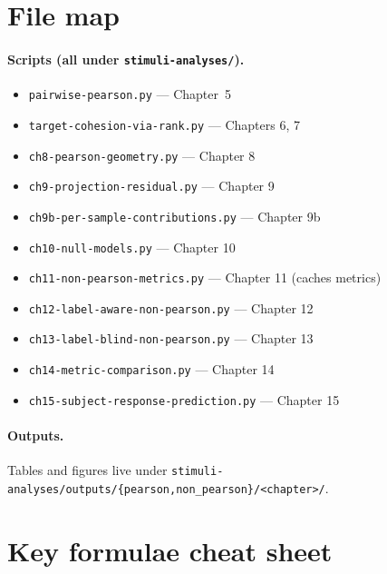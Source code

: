 \documentclass[11pt]{article}
\begin{document}
\appendix
\section{File map}

\paragraph{Scripts (all under \texttt{stimuli-analyses/}).}
\begin{itemize}[leftmargin=*]
\item \texttt{pairwise-pearson.py} --- Chapter~5
\item \texttt{target-cohesion-via-rank.py} --- Chapters 6, 7
\item \texttt{ch8-pearson-geometry.py} --- Chapter 8
\item \texttt{ch9-projection-residual.py} --- Chapter 9
\item \texttt{ch9b-per-sample-contributions.py} --- Chapter 9b
\item \texttt{ch10-null-models.py} --- Chapter 10
\item \texttt{ch11-non-pearson-metrics.py} --- Chapter 11 (caches metrics)
\item \texttt{ch12-label-aware-non-pearson.py} --- Chapter 12
\item \texttt{ch13-label-blind-non-pearson.py} --- Chapter 13
\item \texttt{ch14-metric-comparison.py} --- Chapter 14
\item \texttt{ch15-subject-response-prediction.py} --- Chapter 15
\end{itemize}

\paragraph{Outputs.}
Tables and figures live under
\texttt{stimuli-analyses/outputs/\{pearson,non\_pearson\}/<chapter>/}.

\section{Key formulae cheat sheet}
\end{document}
